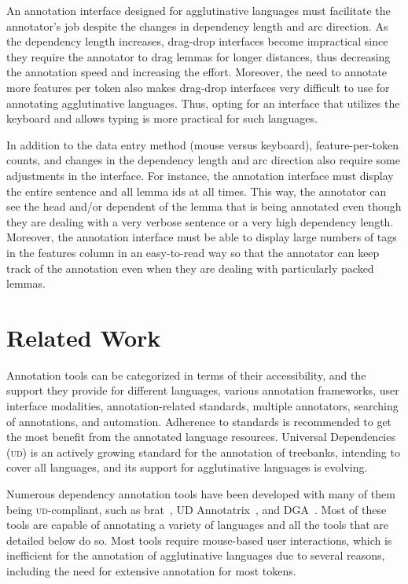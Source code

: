 \documentclass{elektr}
\newcommand{\ud}{\textsc{ud}}
\begin{document}
An annotation interface designed for agglutinative languages must facilitate the annotator's job despite the changes in dependency length and arc direction.
As the dependency length increases, drag-drop interfaces become impractical since they require the annotator to drag lemmas for longer distances, thus decreasing the annotation speed and increasing the effort.
Moreover, the need to annotate more features per token also makes drag-drop interfaces very difficult to use for annotating agglutinative languages.
Thus, opting for an interface that utilizes the keyboard and allows typing is more practical for such languages.

In addition to the data entry method (mouse versus keyboard), feature-per-token counts, and changes in the dependency length and arc direction also require some adjustments in the interface.
For instance, the annotation interface must display the entire sentence and all lemma ids at all times.
This way, the annotator can see the head and/or dependent of the lemma that is being annotated even though they are dealing with a very verbose sentence or a very high dependency length.
Moreover, the annotation interface must be able to display large numbers of tags in the features column in an easy-to-read way so that the annotator can keep track of the annotation even when they are dealing with particularly packed lemmas.

% 
\section{Related Work}
\label{sec:related}

Annotation tools can be categorized in terms of their accessibility, and the support they provide for different languages, various annotation frameworks, user interface modalities, annotation-related standards, multiple annotators, searching of annotations, and automation.
Adherence to standards is recommended to get the most benefit from the annotated language resources.
Universal Dependencies~\cite{ud} (\ud) is an actively growing standard for the annotation of treebanks, intending to cover all languages, and its support for agglutinative languages is evolving.

Numerous dependency annotation tools have been developed with many of them being \ud-compliant, such as brat~\cite{brat}, UD Annotatrix~\cite{ud-annotatrix}, and DGA~\cite{dgannotator}.
Most of these tools are capable of annotating a variety of languages and all the tools that are detailed below do so.
Most tools require mouse-based user interactions, which is inefficient for the annotation of agglutinative languages due to several reasons, including the need for extensive annotation for most tokens.
\end{document}
